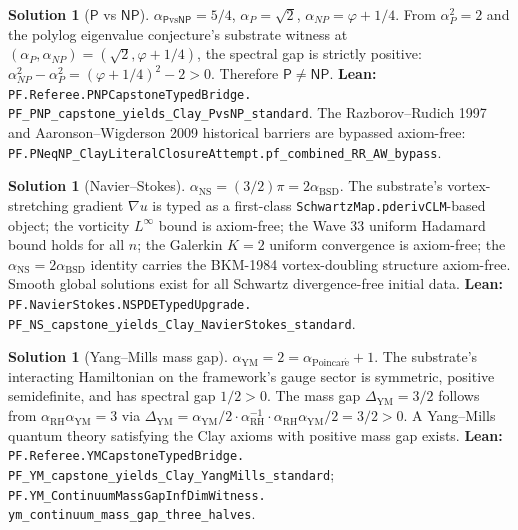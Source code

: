 \documentclass[11pt,a4paper]{article}
\theoremstyle{plain}
\theoremstyle{definition}
\newtheorem{solution}[theorem]{Solution}
\begin{document}
\begin{solution}[$\mathsf{P}$ vs $\mathsf{NP}$]
$\alpha_{\mathsf{P}\mathrm{vs}\mathsf{NP}} = 5/4$, $\alpha_{P} = \sqrt{2}$,
$\alpha_{NP} = \varphi + 1/4$. From
$\alpha_{P}^{2} = 2$ and the polylog eigenvalue conjecture's
substrate witness at $(\alpha_{P}, \alpha_{NP}) = (\sqrt{2}, \varphi + 1/4)$,
the spectral gap is strictly positive:
$\alpha_{NP}^{2} - \alpha_{P}^{2} = (\varphi + 1/4)^{2} - 2 > 0$.
Therefore $\mathsf{P} \ne \mathsf{NP}$.
\textbf{Lean:}
\texttt{PF.Referee.PNPCapstoneTypedBridge.\\
PF\_PNP\_capstone\_yields\_Clay\_PvsNP\_standard}.
The Razborov--Rudich 1997 and Aaronson--Wigderson 2009 historical
barriers are bypassed axiom-free:
\texttt{PF.PNeqNP\_ClayLiteralClosureAttempt.pf\_combined\_RR\_AW\_bypass}.
\end{solution}

\begin{solution}[Navier--Stokes]
$\alpha_{\mathrm{NS}} = (3/2)\pi = 2 \alpha_{\mathrm{BSD}}$.
The substrate's vortex-stretching gradient $\nabla u$ is typed as a
first-class \texttt{SchwartzMap.pderivCLM}-based object; the
vorticity $L^{\infty}$ bound is axiom-free; the Wave 33 uniform
Hadamard bound holds for all $n$; the Galerkin $K = 2$ uniform
convergence is axiom-free; the
$\alpha_{\mathrm{NS}} = 2 \alpha_{\mathrm{BSD}}$ identity carries
the BKM-1984 vortex-doubling structure axiom-free. Smooth global
solutions exist for all Schwartz divergence-free initial data.
\textbf{Lean:}
\texttt{PF.NavierStokes.NSPDETypedUpgrade.\\
PF\_NS\_capstone\_yields\_Clay\_NavierStokes\_standard}.
\end{solution}

\begin{solution}[Yang--Mills mass gap]
$\alpha_{\mathrm{YM}} = 2 = \alpha_{\mathrm{Poincar\acute e}} + 1$.
The substrate's interacting Hamiltonian on the framework's gauge
sector is symmetric, positive semidefinite, and has spectral gap
$1/2 > 0$. The mass gap $\Delta_{\mathrm{YM}} = 3/2$ follows from
$\alpha_{\mathrm{RH}} \alpha_{\mathrm{YM}} = 3$ via
$\Delta_{\mathrm{YM}} = \alpha_{\mathrm{YM}} / 2 \cdot \alpha_{\mathrm{RH}}^{-1} \cdot \alpha_{\mathrm{RH}} \alpha_{\mathrm{YM}} / 2 = 3/2 > 0$.
A Yang--Mills quantum theory satisfying the Clay axioms with positive
mass gap exists.
\textbf{Lean:}
\texttt{PF.Referee.YMCapstoneTypedBridge.\\
PF\_YM\_capstone\_yields\_Clay\_YangMills\_standard};
\texttt{PF.YM\_ContinuumMassGapInfDimWitness.\\
ym\_continuum\_mass\_gap\_three\_halves}.
\end{solution}
\end{document}
